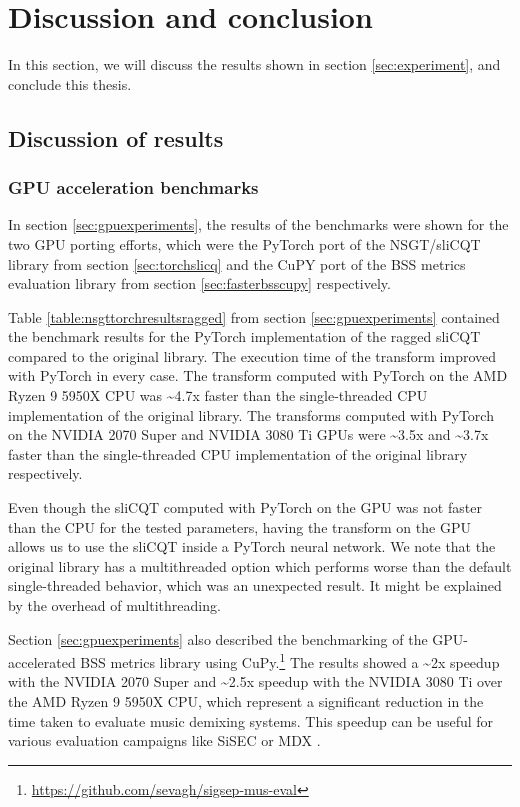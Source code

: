 \documentclass[report.tex]{subfiles}
\begin{document}
\section{Discussion and conclusion}

In this section, we will discuss the results shown in section \ref{sec:experiment}, and conclude this thesis.

\subsection{Discussion of results}
\label{sec:discussion}

\subsubsection{GPU acceleration benchmarks}

In section \ref{sec:gpuexperiments}, the results of the benchmarks were shown for the two GPU porting efforts, which were the PyTorch port of the NSGT/sliCQT library from section \ref{sec:torchslicq} and the CuPY port of the BSS metrics evaluation library from section \ref{sec:fasterbsscupy} respectively.

Table \ref{table:nsgttorchresultsragged} from section \ref{sec:gpuexperiments} contained the benchmark results for the PyTorch implementation of the ragged sliCQT compared to the original library. The execution time of the transform improved with PyTorch in every case. The transform computed with PyTorch on the AMD Ryzen 9 5950X CPU was \textasciitilde4.7x faster than the single-threaded CPU implementation of the original library. The transforms computed with PyTorch on the NVIDIA 2070 Super and NVIDIA 3080 Ti GPUs were \textasciitilde3.5x and \textasciitilde3.7x faster than the single-threaded CPU implementation of the original library respectively.

Even though the sliCQT computed with PyTorch on the GPU was not faster than the CPU for the tested parameters, having the transform on the GPU allows us to use the sliCQT inside a PyTorch neural network. We note that the original library has a multithreaded option which performs worse than the default single-threaded behavior, which was an unexpected result. It might be explained by the overhead of multithreading.

Section \ref{sec:gpuexperiments} also described the benchmarking of the GPU-accelerated BSS metrics library using CuPy.\footnote{\url{https://github.com/sevagh/sigsep-mus-eval}} The results showed a \textasciitilde2x speedup with the NVIDIA 2070 Super and \textasciitilde2.5x speedup with the NVIDIA 3080 Ti over the AMD Ryzen 9 5950X CPU, which represent a significant reduction in the time taken to evaluate music demixing systems. This speedup can be useful for various evaluation campaigns like SiSEC \parencite{sisec2018} or MDX \parencite{mdx21}.
\end{document}
